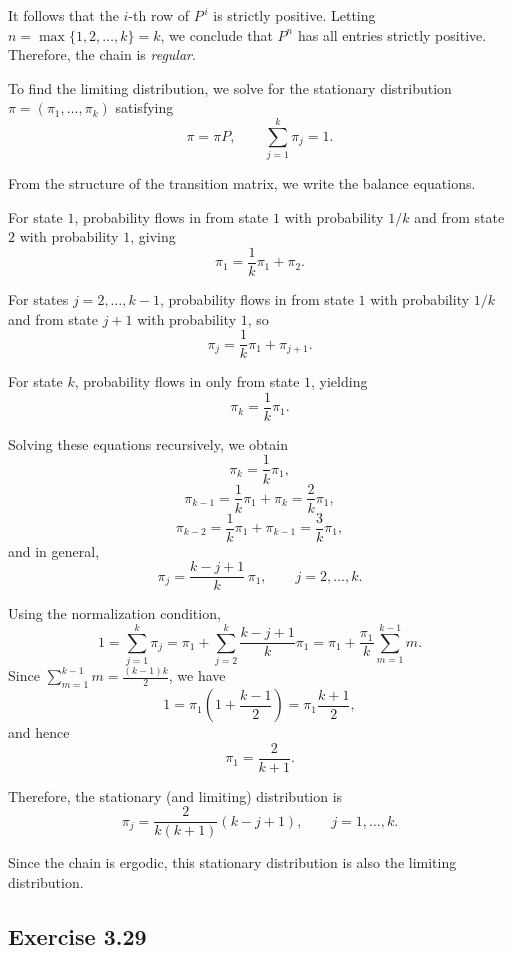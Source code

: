 \documentclass[hidelinks]{article}
\begin{document}
\noindent It follows that the $i$-th row of $P^{\,i}$ is strictly positive.
Letting $n = \max\{1,2,\dots,k\} = k$, we conclude that $P^n$ has all
entries strictly positive. Therefore, the chain is \emph{regular}.

\noindent To find the limiting distribution, we solve for the stationary distribution
$\pi = (\pi_1,\dots,\pi_k)$ satisfying
\[
\pi = \pi P, \qquad \sum_{j=1}^k \pi_j = 1.
\]

\noindent From the structure of the transition matrix, we write the balance equations.

\noindent For state $1$, probability flows in from state $1$ with probability $1/k$
and from state $2$ with probability $1$, giving
\[
\pi_1 = \frac{1}{k}\pi_1 + \pi_2.
\]

\noindent For states $j = 2,\dots,k-1$, probability flows in from state $1$ with
probability $1/k$ and from state $j+1$ with probability $1$, so
\[
\pi_j = \frac{1}{k}\pi_1 + \pi_{j+1}.
\]

\noindent For state $k$, probability flows in only from state $1$, yielding
\[
\pi_k = \frac{1}{k}\pi_1.
\]

\noindent Solving these equations recursively, we obtain
\[
\pi_k = \frac{1}{k}\pi_1,
\]
\[
\pi_{k-1} = \frac{1}{k}\pi_1 + \pi_k = \frac{2}{k}\pi_1,
\]
\[
\pi_{k-2} = \frac{1}{k}\pi_1 + \pi_{k-1} = \frac{3}{k}\pi_1,
\]
\noindent and in general,
\[
\pi_j = \frac{k-j+1}{k}\,\pi_1, \qquad j=2,\dots,k.
\]

\noindent Using the normalization condition,
\[
1 = \sum_{j=1}^k \pi_j
= \pi_1 + \sum_{j=2}^k \frac{k-j+1}{k}\pi_1
= \pi_1 + \frac{\pi_1}{k} \sum_{m=1}^{k-1} m.
\]
Since $\sum_{m=1}^{k-1} m = \frac{(k-1)k}{2}$, we have
\[
1 = \pi_1\left(1 + \frac{k-1}{2}\right)
= \pi_1 \frac{k+1}{2},
\]
and hence
\[
\pi_1 = \frac{2}{k+1}.
\]

\noindent Therefore, the stationary (and limiting) distribution is
\[
\boxed{
\pi_j = \frac{2}{k(k+1)}(k-j+1), \qquad j=1,\dots,k.
}
\]

\noindent Since the chain is ergodic, this stationary distribution is also the
limiting distribution.

\subsection{Exercise 3.29}
\end{document}
